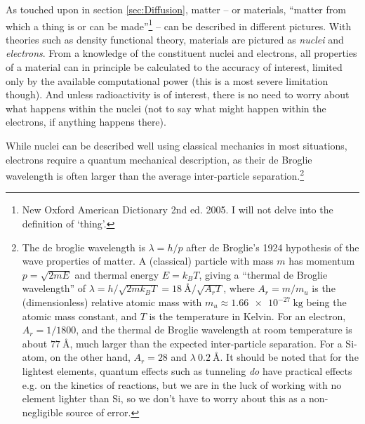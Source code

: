 \documentclass[11pt,bibliography=totoc,index=totoc]{scrbook}   %
\begin{document}

As touched upon in section \ref{sec:Diffusion}, matter – or materials, ``matter from which a thing is or can be made''\footnote{New Oxford American Dictionary 2nd ed. 2005. I will not delve into the definition of `thing'.} – can be described in different pictures. 
With theories such as density functional theory, materials are pictured as \emph{nuclei} and \emph{electrons}. %
From a knowledge of the constituent nuclei and electrons, all properties of a material can in principle be calculated to the accuracy of interest, limited only by the available computational power (this is a most severe limitation though).
And unless radioactivity is of interest, there is no need to worry about what happens within the nuclei (not to say what might happen within the electrons, if anything happens there).


While nuclei can be described well using classical mechanics in most situations, electrons require a quantum mechanical description, as their de Broglie wavelength
is often larger than the average inter-particle separation.\footnote{The de broglie wavelength is $\lambda=h/p$ after de Broglie's 1924 hypothesis of the wave properties of matter.\cite{deBroglie:1924} A (classical) particle with mass $m$ has momentum $p=\sqrt{2mE}$ and thermal energy $E=k_BT$, giving a ``thermal de Broglie wavelength''\cite[114]{Styer:2007} of $\lambda=h/\sqrt{2mk_BT}=\SI{18}{\angstrom}/\sqrt{A_r T}$, where $A_r=m/m_u$ is the (dimensionless) relative atomic mass with
$m_u\approx\SI{1.66e-27}{\kilogram}$ being the atomic mass constant, and $T$ is the temperature in Kelvin. For an electron, $A_r=1/1800$, and the thermal de Broglie wavelength at room temperature is about $\SI{77}{\angstrom}$, much larger than the expected inter-particle separation. For a Si-atom, on the other hand, $A_r=28$ and $\lambda ~ \SI{0.2}{\angstrom}$. It should be noted that for the lightest elements, quantum effects such as tunneling \emph{do} have practical effects e.g. on the kinetics of reactions, but we are in the luck of working with no element lighter than Si, so we don't have to worry about this as a non-negligible source of error.}
\end{document}
